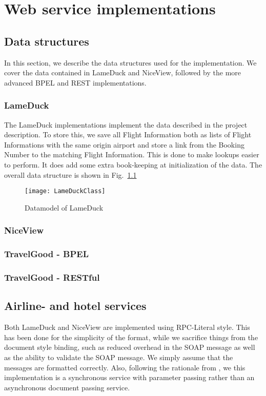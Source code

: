 {\setlength{\chapterfontsize}{23pt}
\chapter{Web service implementations}
}

\section{Data structures}
In this section, we describe the data structures used for the implementation. We cover the data contained in LameDuck and NiceView, followed by the more advanced BPEL and REST implementations.

\subsection{LameDuck}
The LameDuck implementations implement the data described in the project description. To store this, we save all Flight Information both as lists of Flight Informations with the same origin airport and store a link from the Booking Number to the matching Flight Information. This is done to make lookups easier to perform. It does add some extra book-keeping at initialization of the data. The overall data structure is shown in Fig.~\ref{fig:lameduck_class}

\begin{figure}[htb]
\centering
\texttt{[image: LameDuckClass]}
\caption{Datamodel of LameDuck}
\label{fig:lameduck_class}
\end{figure}

\subsection{NiceView}
\subsection{TravelGood - BPEL}

\subsection{TravelGood - RESTful}
\section{Airline- and hotel services}
Both LameDuck and NiceView are implemented using RPC-Literal style. This has been done for the simplicity of the format, while we sacrifice things from the document style binding, such as reduced overhead in the SOAP message as well as the ability to validate the SOAP message. We simply assume that the messages are formatted correctly.
Also, following the rationale from \cite{papazoglou2008web}, we this implementation is a synchronous service with parameter passing rather than an asynchronous document passing service.

